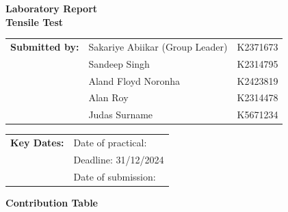 \documentclass{article}
\begin{document}
        

    \vspace*{\fill}
    \begin{center}
        \textbf{\Huge Laboratory Report}\\[10pt]
        \LARGE \textbf{Tensile Test}
    \end{center}
    \vspace*{\fill}

    \Large    
    \begin{tabular}{@{}l l l@{}}
        \textbf{Submitted by:} & Sakariye Abiikar (Group Leader)\phantom{ssssss} & K2371673 \\
        & Sandeep Singh & K2314795 \\
        & Aland Floyd Noronha & K2423819 \\
        & Alan Roy & K2314478 \\
        & Judas Surname & K5671234 \\
    \end{tabular}
    
    \vspace*{\fill}
    
    \begin{tabular}{@{}l l@{}}
        \textbf{Key Dates:} & Date of practical: \\
        & Deadline: 31/12/2024 \\
        & Date of submission: \\
    \end{tabular}
    \vspace*{\fill}
    
    \large
    \newpage\noindent\vspace{2em}
    \begin{center}
        \LARGE \textbf{Contribution Table}\\[3em]
    \end{center}
    
\end{document}
